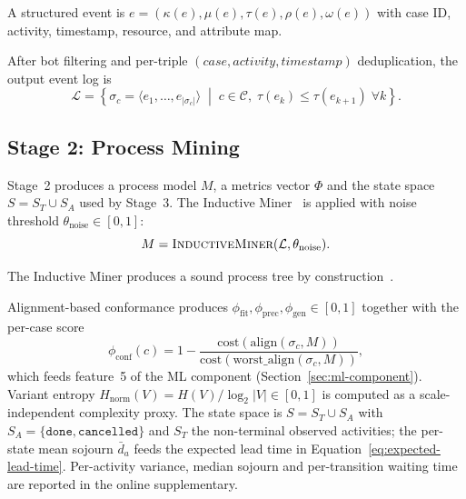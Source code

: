 \begin{definition}
\label{def:structured-event}
A structured event is
$e = (\kappa(e), \mu(e), \tau(e), \rho(e), \omega(e))$ with case ID,
activity, timestamp, resource, and attribute map.
\end{definition}

After bot filtering and per-triple $(case, activity, timestamp)$
deduplication, the output event log is
\begin{equation}
\label{eq:final-log}
\mathcal{L} = \left\{ \sigma_c = \langle e_1, \ldots, e_{|\sigma_c|} \rangle
    \;\middle|\; c \in \mathcal{C}, \;
    \tau(e_k) \leq \tau(e_{k+1}) \; \forall k \right\}.
\end{equation}

\subsection{Stage 2: Process Mining}
\label{sec:stages-s2}

Stage~2 produces a process model $M$, a metrics vector $\Phi$ and the
state space $S = S_T \cup S_A$ used by Stage~3. The Inductive
Miner~\cite{leemans2013discovering} is applied with noise threshold
$\theta_{\text{noise}} \in [0,1]$:
\begin{equation}
\label{eq:discovery}
M = \textsc{InductiveMiner}(\mathcal{L}, \theta_{\text{noise}}).
\end{equation}

\begin{property}
\label{prop:soundness}
The Inductive Miner produces a sound process tree by
construction~\cite{leemans2013discovering}.
\end{property}

Alignment-based conformance produces
$\phi_{\text{fit}}, \phi_{\text{prec}}, \phi_{\text{gen}} \in [0,1]$
together with the per-case score
\begin{equation}
\label{eq:case-conformance}
\phi_{\text{conf}}(c) = 1 - \frac{\text{cost}(\text{align}(\sigma_c, M))}
    {\text{cost}(\text{worst\_align}(\sigma_c, M))},
\end{equation}
which feeds feature~5 of the ML component
(Section~\ref{sec:ml-component}). Variant entropy
$H_{\text{norm}}(V) = H(V) / \log_2 |V| \in [0,1]$ is computed as a
scale-independent complexity proxy. The state space is
$S = S_T \cup S_A$ with $S_A = \{\texttt{done}, \texttt{cancelled}\}$
and $S_T$ the non-terminal observed activities; the per-state mean
sojourn $\bar{d}_a$ feeds the expected lead time in
Equation~\ref{eq:expected-lead-time}. Per-activity variance, median
sojourn and per-transition waiting time are reported in the online
supplementary.

